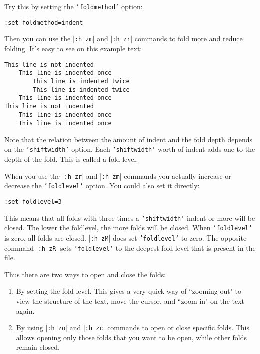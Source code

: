 Try this by setting the \texttt{'foldmethod'} option:

\begin{Verbatim}[samepage=true]
 :set foldmethod=indent
\end{Verbatim}

Then you can use the |\texttt{:h zm}| and |\texttt{:h zr}| commands to fold more and reduce folding.
It's easy to see on this example text:

\begin{Verbatim}[samepage=true]
This line is not indented
    This line is indented once
        This line is indented twice
        This line is indented twice
    This line is indented once
This line is not indented
    This line is indented once
    This line is indented once
\end{Verbatim}

Note that the relation between the amount of indent and the fold depth depends on the \texttt{'shiftwidth'} option.
Each \texttt{'shiftwidth'} worth of indent adds one to the depth of the fold.
This is called a fold level.

When you use the |\texttt{:h zr}| and |\texttt{:h zm}| commands you actually increase or decrease the \texttt{'foldlevel'} option.
You could also set it directly:

\begin{Verbatim}[samepage=true]
 :set foldlevel=3
\end{Verbatim}

This means that all folds with three times a \texttt{'shiftwidth'} indent or more will be closed.
The lower the foldlevel, the more folds will be closed.
When \texttt{'foldlevel'} is zero, all folds are closed.
|\texttt{:h zM}| does set \texttt{'foldlevel'} to zero.
The opposite command |\texttt{:h zR}| sets \texttt{'foldlevel'} to the deepest fold level that is present in the file.

Thus there are two ways to open and close the folds:
\begin{enumerate}
\item By setting the fold level.
This gives a very quick way of ``zooming out" to view the structure of the text, move the cursor, and ``zoom in" on the text again.

\item By using |\texttt{:h zo}| and |\texttt{:h zc}| commands to open or close specific folds.
This allows opening only those folds that you want to be open, while other folds remain closed.
\end{enumerate}

